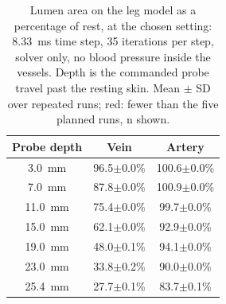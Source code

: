 \begin{table}[!tbp]
\centering
\caption{Lumen area on the leg model as a percentage of rest, at the chosen setting: 8.33~ms time step, 35 iterations
per step, solver only, no blood pressure inside the vessels. Depth is the commanded probe travel past the resting skin.
Mean $\pm$ SD over repeated runs; red: fewer than the five planned runs, n shown.}
\label{tab:vein_closure}
\begin{tabular}{ccc}
\hline
\textbf{Probe depth} & \textbf{Vein} & \textbf{Artery} \\
\hline
3.0~mm & 96.5$\pm$0.0\% & 100.6$\pm$0.0\% \\
7.0~mm & 87.8$\pm$0.0\% & 100.9$\pm$0.0\% \\
11.0~mm & 75.4$\pm$0.0\% & 99.7$\pm$0.0\% \\
15.0~mm & 62.1$\pm$0.0\% & 92.9$\pm$0.0\% \\
19.0~mm & 48.0$\pm$0.1\% & 94.1$\pm$0.0\% \\
23.0~mm & 33.8$\pm$0.2\% & 90.0$\pm$0.0\% \\
25.4~mm & 27.7$\pm$0.1\% & 83.7$\pm$0.1\% \\
\hline
\end{tabular}
\end{table}
